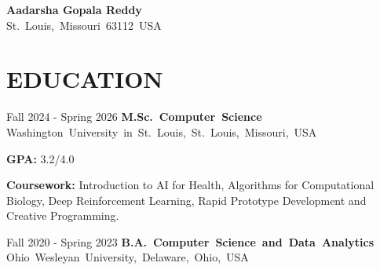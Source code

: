 \documentclass[10pt, letterpaper]{article}
\begin{document}
\begin{header}
    \fontsize{20pt}{20pt}\selectfont \textbf{Aadarsha Gopala Reddy}\\
    \normalsize
    \vspace{\headerSpacing}
    \mbox{St. Louis, Missouri 63112 USA}%
    \kern {}%
    \AND%
    \kern {}%
    \mbox{}%
    \kern {}%
    \AND%
    \kern {}%
    \mbox{}%
    \kern {}%
    \AND%
    \kern {}%
    \mbox{}%
\end{header}

\section{EDUCATION}

\begin{twocolentry}{Fall 2024 - Spring 2026}
    \mbox{\textbf{M.Sc. Computer Science}}
    \kern {}
    \AND
    \kern {}
    \mbox{Washington University in St. Louis, St. Louis, Missouri, USA}
\end{twocolentry}

\vspace{\highlightSpacing}
\begin{onecolentry}
    \begin{highlights}
        \item \textbf{GPA:} 3.2/4.0
        \item \textbf{Coursework:} Introduction to AI for Health, Algorithms for Computational Biology, Deep Reinforcement Learning, Rapid Prototype Development and Creative Programming.
    \end{highlights}
\end{onecolentry}

\begin{twocolentry}{Fall 2020 - Spring 2023}
    \mbox{\textbf{B.A. Computer Science and Data Analytics}}
    \kern {}
    \AND
    \kern {}
    \mbox{Ohio Wesleyan University, Delaware, Ohio, USA}
\end{twocolentry}
\end{document}

